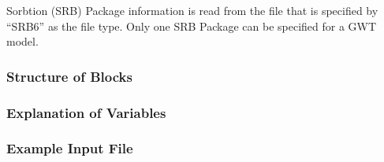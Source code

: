 Sorbtion (SRB) Package information is read from the file that is specified by ``SRB6'' as the file type.  Only one SRB Package can be specified for a GWT model. 

\vspace{5mm}
\subsubsection{Structure of Blocks}



\vspace{5mm}
\subsubsection{Explanation of Variables}
\begin{description}

\end{description}

\vspace{5mm}
\subsubsection{Example Input File}


